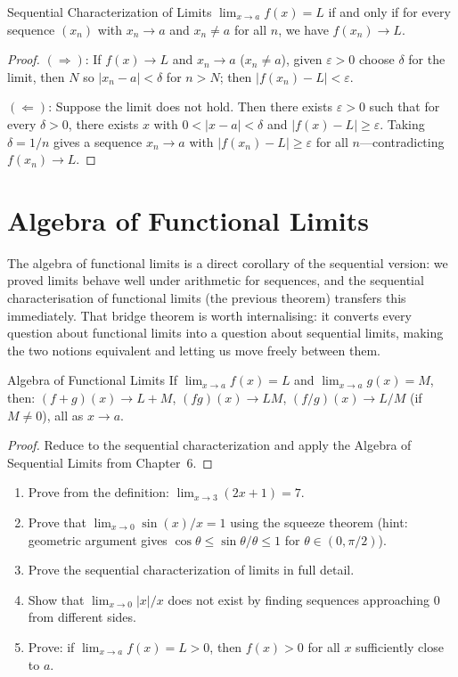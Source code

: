 \documentclass[12pt, openany]{book}
\theoremstyle{plain}
\theoremstyle{definition}
\theoremstyle{remark}
\newcommand{\eps}{\varepsilon}
\newcommand{\del}{\delta}
\begin{document}
\begin{thmbox}{Sequential Characterization of Limits}
$\lim_{x \to a} f(x) = L$ if and only if for every sequence $(x_n)$ with $x_n \to a$ and $x_n \neq a$ for all $n$, we have $f(x_n) \to L$.
\end{thmbox}
\color{black}

\begin{proof}
$(\Rightarrow)$: If $f(x) \to L$ and $x_n \to a$ ($x_n \neq a$), given $\eps > 0$ choose $\del$ for the limit, then $N$ so $|x_n - a| < \del$ for $n > N$; then $|f(x_n) - L| < \eps$.

$(\Leftarrow)$: Suppose the limit does not hold. Then there exists $\eps > 0$ such that for every $\del > 0$, there exists $x$ with $0 < |x - a| < \del$ and $|f(x) - L| \geq \eps$. Taking $\del = 1/n$ gives a sequence $x_n \to a$ with $|f(x_n) - L| \geq \eps$ for all $n$---contradicting $f(x_n) \to L$.
\end{proof}

\section{Algebra of Functional Limits}

The algebra of functional limits is a direct corollary of the sequential version: we proved limits behave well under arithmetic for sequences, and the sequential characterisation of functional limits (the previous theorem) transfers this immediately.  That bridge theorem is worth internalising: it converts every question about functional limits into a question about sequential limits, making the two notions equivalent and letting us move freely between them.

\begin{thmbox}{Algebra of Functional Limits}
If $\lim_{x \to a} f(x) = L$ and $\lim_{x \to a} g(x) = M$, then:
$(f + g)(x) \to L + M$, $(fg)(x) \to LM$, $(f/g)(x) \to L/M$ (if $M \neq 0$), all as $x \to a$.
\end{thmbox}
\color{black}

\begin{proof}
Reduce to the sequential characterization and apply the Algebra of Sequential Limits from Chapter~6.
\end{proof}

\begin{exbox}
\begin{enumerate}
  \item Prove from the definition: $\lim_{x \to 3} (2x + 1) = 7$.
  \item Prove that $\lim_{x \to 0} \sin(x)/x = 1$ using the squeeze theorem (hint: geometric argument gives $\cos\theta \leq \sin\theta/\theta \leq 1$ for $\theta \in (0, \pi/2)$).
  \item Prove the sequential characterization of limits in full detail.
  \item Show that $\lim_{x \to 0} |x|/x$ does not exist by finding sequences approaching $0$ from different sides.
  \item Prove: if $\lim_{x \to a} f(x) = L > 0$, then $f(x) > 0$ for all $x$ sufficiently close to $a$.
\end{enumerate}
\end{exbox}
\color{black}
\end{document}
